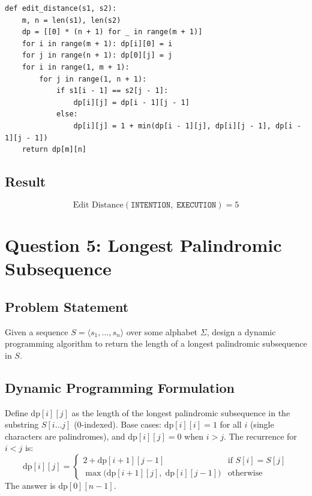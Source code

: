 \documentclass[12pt,a4paper]{article}
\begin{document}
\begin{verbatim}
def edit_distance(s1, s2):
    m, n = len(s1), len(s2)
    dp = [[0] * (n + 1) for _ in range(m + 1)]
    for i in range(m + 1): dp[i][0] = i
    for j in range(n + 1): dp[0][j] = j
    for i in range(1, m + 1):
        for j in range(1, n + 1):
            if s1[i - 1] == s2[j - 1]:
                dp[i][j] = dp[i - 1][j - 1]
            else:
                dp[i][j] = 1 + min(dp[i - 1][j], dp[i][j - 1], dp[i - 1][j - 1])
    return dp[m][n]
\end{verbatim}

\subsection*{Result}

\[
    \text{Edit Distance}(\texttt{INTENTION},\; \texttt{EXECUTION}) = \boxed{5}
\]

\newpage

\section*{Question 5: Longest Palindromic Subsequence}

\subsection*{Problem Statement}
Given a sequence $S = \langle s_1, \ldots, s_n \rangle$ over some alphabet $\Sigma$, design a dynamic programming algorithm to return the length of a longest palindromic subsequence in $S$.

\subsection*{Dynamic Programming Formulation}

Define $\text{dp}[i][j]$ as the length of the longest palindromic subsequence in the substring $S[i \ldots j]$ (0-indexed). Base cases: $\text{dp}[i][i] = 1$ for all $i$ (single characters are palindromes), and $\text{dp}[i][j] = 0$ when $i > j$. The recurrence for $i < j$ is:
\[
    \text{dp}[i][j] = \begin{cases}
        2 + \text{dp}[i+1][j-1] & \text{if } S[i] = S[j] \\[4pt]
        \max\!\big(\text{dp}[i+1][j],\; \text{dp}[i][j-1]\big) & \text{otherwise}
    \end{cases}
\]
The answer is $\text{dp}[0][n-1]$.
\end{document}
